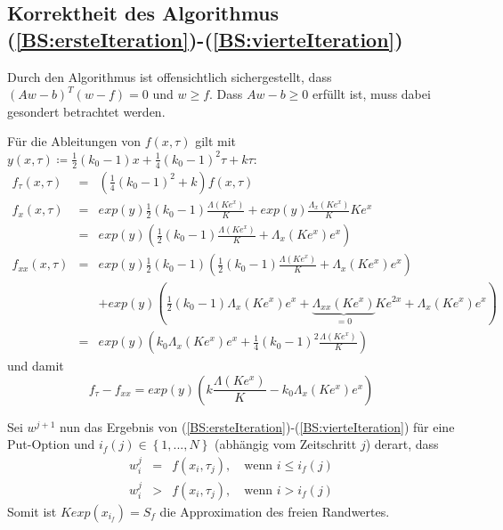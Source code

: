 \subsection{Korrektheit des Algorithmus (\ref{BS:ersteIteration})-(\ref{BS:vierteIteration})}
\label{Anhang:KorrektheitAlgo}

Durch den Algorithmus ist offensichtlich sichergestellt, dass $\left(Aw-b\right)^T\left(w-f\right) = 0$ und $w \geq f$. Dass $Aw-b \geq 0$ erfüllt ist, muss dabei gesondert betrachtet werden.

Für die Ableitungen von $f(x,\tau)$ gilt mit $y(x,\tau) \coloneqq \frac{1}{2}\left(k_0-1\right)x + \frac{1}{4}\left(k_0-1\right)^2\tau + k\tau$:
\begin{eqnarray*}
f_{\tau}(x,\tau) &=& \left(\tfrac{1}{4}\left(k_0-1\right)^2+k\right)f(x,\tau) \\
f_x(x,\tau) & = & exp\left(y\right)\frac{1}{2}(k_0-1)\frac{\Lambda(Ke^x)}{K} + exp\left(y\right)\frac{\Lambda_{x}(Ke^x)}{K}Ke^x \\
& = & exp\left(y\right)\left(\frac{1}{2}(k_0-1)\frac{\Lambda(Ke^x)}{K} + \Lambda_{x}(Ke^x)e^x\right) \\
f_{xx}(x,\tau) & = & exp(y)\frac{1}{2}(k_0-1)\left(\frac{1}{2}(k_0-1)\frac{\Lambda(Ke^x)}{K} + \Lambda_{x}(Ke^x)e^x\right) \\
 & & + exp(y)\left(\frac{1}{2}(k_0-1)\Lambda_{x}(Ke^x)e^x+\underbrace{\Lambda_{xx}(Ke^x)}_{=0}Ke^{2x}+\Lambda_{x}(Ke^x)e^x\right) \\
 & = & exp(y)\left(k_0\Lambda_{x}(Ke^x)e^x+\frac{1}{4}(k_0-1)^2\frac{\Lambda(Ke^x)}{K}\right)
\end{eqnarray*}
und damit
\begin{equation}
f_{\tau}-f_{xx} = exp(y)\left(k\frac{\Lambda(Ke^x)}{K}-k_0\Lambda_{x}(Ke^x)e^x\right) \label{BS:ftau-fxx}
\end{equation}

Sei $w^{j+1}$ nun das Ergebnis von (\ref{BS:ersteIteration})-(\ref{BS:vierteIteration}) für eine Put-Option und $i_f(j) \in \left\{1,...,N\right\}$ (abhängig vom Zeitschritt $j$) derart, dass
\begin{eqnarray}
w_i^{j} &=& f(x_i,\tau _{j}), \quad \text{wenn } i \leq i_f(j) \label{BS:w-f1} \\
w_i^{j} &>& f(x_i,\tau _{j}), \quad \text{wenn } i>i_f(j) \label{BS:w-f2}
\end{eqnarray}
Somit ist $Kexp(x_{i_f}) = S_f$ die Approximation des freien Randwertes. 

